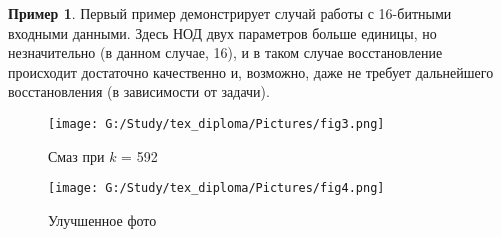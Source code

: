 \documentclass[a4paper]{article}
\theoremstyle{definition}
\newtheorem{example}{Пример}[section]
\begin{document}
\begin{example}

Первый пример демонстрирует случай работы с 16-битными входными данными. Здесь НОД двух параметров больше единицы, но незначительно (в данном случае, 16), и в таком случае восстановление происходит достаточно качественно и, возможно, даже не требует дальнейшего восстановления (в зависимости от задачи).

\hspace*{-\parindent}
\begin{minipage}{80mm}
    \begin{figure}[H]
            \texttt{[image: G:/Study/tex\_diploma/Pictures/fig3.png]}
            \label{Fig3}
            \caption[Смаз при $k$ = 592]{Смаз при $k$ = 592}
        \end{figure}
\end{minipage}
\begin{minipage}{80mm}
  \begin{figure}[H]
            \texttt{[image: G:/Study/tex\_diploma/Pictures/fig4.png]}
            \label{Fig4}
            \caption[Улучшенное фото]{Улучшенное фото}
        \end{figure}
\end{minipage}
\hfill

\end{example}
\vspace*{10mm}
\end{document}
